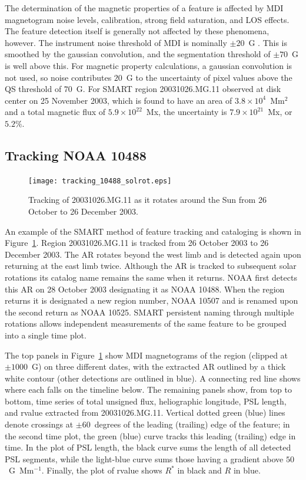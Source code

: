 The determination of the magnetic properties of a feature is affected by MDI magnetogram noise levels, calibration, strong field saturation, and LOS effects. The feature detection itself is generally not affected by these phenomena, however. The instrument noise threshold of MDI is nominally $\pm20$~G \citep{Scherrer:1995}. This is smoothed by the gaussian convolution, and the segmentation threshold of $\pm70$~G is well above this. For magnetic property calculations, a gaussian convolution is not used, so noise contributes $20$~G to the uncertainty of pixel values above the QS threshold of $70$~G. For SMART region 20031026.MG.11 observed at disk center on 25 November 2003, which is found to have an area of $3.8\times10^{4}$~Mm$^2$ and a total magnetic flux of $5.9\times10^{22}$~Mx, the uncertainty is $7.9\times10^{21}$~Mx, or $5.2\%$.


\subsection{Tracking NOAA 10488}\label{sect:trackstab}

\begin{figure}[!ht]
\begin{center}
\texttt{[image: tracking\_10488\_solrot.eps]}
\end{center}
\caption{Tracking of 20031026.MG.11 as it rotates around the Sun from 26 October to 26 December 2003.}\label{ar_track}
\end{figure}

An example of the \gls{SMART} method of feature tracking and cataloging is shown in Figure~\ref{ar_track}. Region 20031026.MG.11 is tracked from 26 October 2003 to 26 December 2003. The AR rotates beyond the west limb and is detected again upon returning at the east limb twice. Although the AR is tracked to subsequent solar rotations its catalog name remains the same when it returns. \gls{NOAA} first detects this AR on 28 October 2003 designating it as \gls{NOAA} 10488. When the region returns it is designated a new region number, \gls{NOAA} 10507 and is renamed upon the second return as \gls{NOAA} 10525. \gls{SMART} persistent naming through multiple rotations allows independent measurements of the same feature to be grouped into a single time plot.

The top panels in Figure~\ref{ar_track} show \gls{MDI} magnetograms of the region (clipped at $\pm1000$~G) on three different dates, with the extracted AR outlined by a thick white contour (other detections are outlined in blue). A connecting red line shows where each falls on the timeline below. The remaining panels show, from top to bottom, time series of total unsigned flux, heliographic longitude, \gls{PSL} length, and \gls{rvalue} extracted from 20031026.MG.11. Vertical dotted green (blue) lines denote crossings at $\pm60$~degrees of the leading (trailing) edge of the feature; in the second time plot, the green (blue) curve tracks this leading (trailing) edge in time. In the plot of \gls{PSL} length, the black curve sums the length of all detected \gls{PSL} segments, while the light-blue curve sums those having a gradient above $50$~G~Mm$^{-1}$. Finally, the plot of \gls{rvalue} shows $R^{*}$ in black and $R$ in blue.


